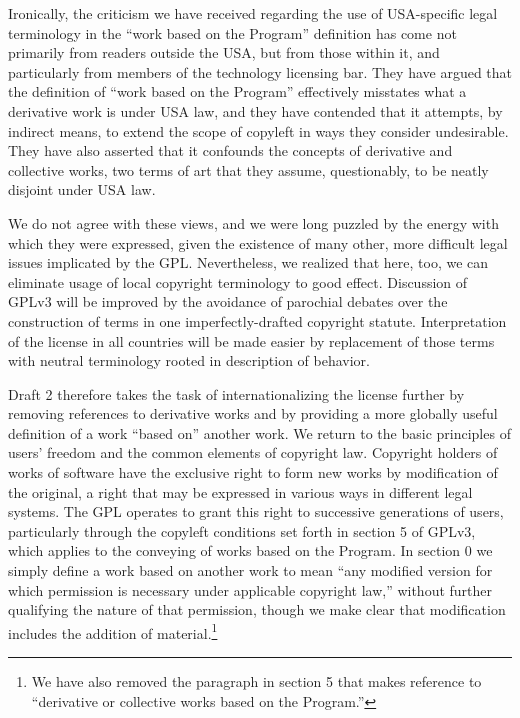 
Ironically, the criticism we have received regarding the use of
USA-specific legal terminology in the ``work based on the Program''
definition has come not primarily from readers outside the USA, but
from those within it, and particularly from members of the technology
licensing bar.  They have argued that the definition of ``work based
on the Program'' effectively misstates what a derivative work is under
USA law, and they have contended that it attempts, by indirect means,
to extend the scope of copyleft in ways they consider undesirable.
They have also asserted that it confounds the concepts of derivative
and collective works, two terms of art that they assume, questionably,
to be neatly disjoint under USA law.


We do not agree with these views, and we were long puzzled by the
energy with which they were expressed, given the existence of many
other, more difficult legal issues implicated by the GPL.
Nevertheless, we realized that here, too, we can eliminate usage of
local copyright terminology to good effect.  Discussion of GPLv3 will
be improved by the avoidance of parochial debates over the
construction of terms in one imperfectly-drafted copyright statute.
Interpretation of the license in all countries will be made easier by
replacement of those terms with neutral terminology rooted in
description of behavior.


Draft 2 therefore takes the task of internationalizing the license
further by removing references to derivative works and by providing a
more globally useful definition of a work ``based on'' another work.
We return to the basic principles of users' freedom and the common
elements of copyright law.  Copyright holders of works of software
have the exclusive right to form new works by modification of the
original, a right that may be expressed in various ways in different
legal systems.  The GPL operates to grant this right to successive
generations of users, particularly through the copyleft conditions set
forth in section 5 of GPLv3, which applies to the conveying of works
based on the Program.  In section 0 we simply define a work based on
another work to mean ``any modified version for which permission is
necessary under applicable copyright law,'' without further qualifying
the nature of that permission, though we make clear that modification
includes the addition of material.\footnote{We have also removed the
paragraph in section 5 that makes reference to ``derivative or
collective works based on the Program.''}

